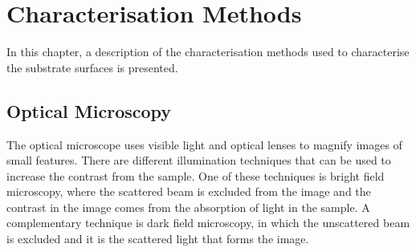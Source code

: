 \chapter{Characterisation Methods}\label{ch:methods}
In this chapter, a description of the characterisation methods used to characterise the substrate surfaces is presented. %
\section{Optical Microscopy}

The optical microscope uses visible light and optical lenses to magnify images of small features. There are different illumination techniques that can be used to increase the contrast from the sample. One of these techniques is bright field microscopy, where the scattered beam is excluded from the image and the contrast in the image comes from the absorption of light in the sample. A complementary technique is dark field microscopy, in which the unscattered beam is excluded and it is the scattered light that forms the image.

